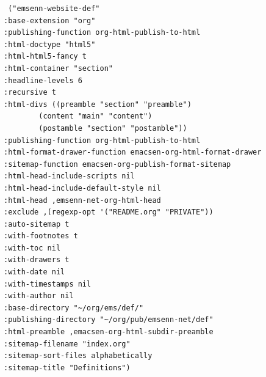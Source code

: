 \documentclass[11pt]{article}
\begin{document}
\begin{itemize}
\begin{itemize}
\begin{itemize}
\begin{verbatim}
 ("emsenn-website-def"
:base-extension "org"
:publishing-function org-html-publish-to-html
:html-doctype "html5"
:html-html5-fancy t
:html-container "section"
:headline-levels 6
:recursive t
:html-divs ((preamble "section" "preamble")
	    (content "main" "content")
	    (postamble "section" "postamble"))
:publishing-function org-html-publish-to-html
:html-format-drawer-function emacsen-org-html-format-drawer
:sitemap-function emacsen-org-publish-format-sitemap
:html-head-include-scripts nil
:html-head-include-default-style nil
:html-head ,emsenn-net-org-html-head
:exclude ,(regexp-opt '("README.org" "PRIVATE"))
:auto-sitemap t
:with-footnotes t
:with-toc nil
:with-drawers t
:with-date nil
:with-timestamps nil
:with-author nil
:base-directory "~/org/ems/def/"
:publishing-directory "~/org/pub/emsenn-net/def"
:html-preamble ,emacsen-org-html-subdir-preamble
:sitemap-filename "index.org"
:sitemap-sort-files alphabetically
:sitemap-title "Definitions")


\end{verbatim}
\end{itemize}
\end{itemize}
\end{itemize}
\end{document}
